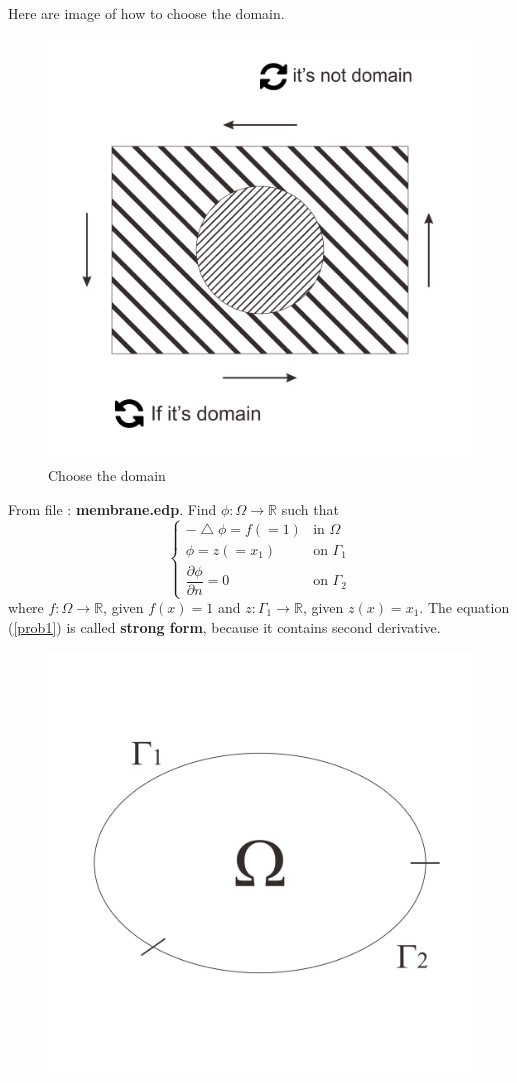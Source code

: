 \documentclass[a4paper,10pt]{article}
\begin{document}
\newpage
Here are image of how to choose the domain.
\begin{figure}[h!]
	\centering
	\includegraphics[width=0.5\linewidth]{picture/example2-2}
	\caption{Choose the domain}
	\label{fig:example2-2}
\end{figure}

From file : \textbf{membrane.edp}. Find $ \phi : \Omega \rightarrow \mathbb{R} $ such that
\begin{equation}\label{prob1}
\begin{cases}
-\bigtriangleup \phi = f (=1) & \text{in } \Omega \\
\phi = z (=x_{1}) & \text{on } \Gamma_{1} \\
\dfrac{\partial \phi}{\partial n} = 0 & \text{on } \Gamma_{2}
\end{cases}
\end{equation}
where $ f : \Omega \rightarrow \mathbb{R} $, given $ f(x)=1 $ and $ z : \Gamma_{1} \rightarrow \mathbb{R} $, given $ z(x)=x_{1} $. The equation (\ref{prob1}) is called \textbf{strong form}, because it contains second derivative.

\begin{figure}[h!]
	\centering
	\includegraphics[width=0.4\linewidth]{picture/strongformdomain}
	\caption{}
	\label{fig:strongformdomain}
\end{figure}
\end{document}
